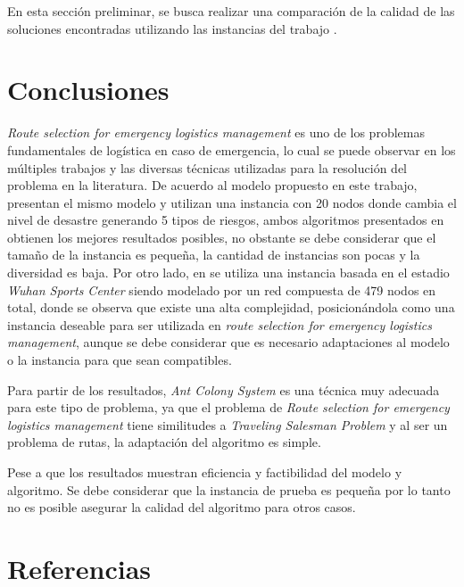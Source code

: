 \documentclass{llncs}
\begin{document}
En esta sección preliminar, se busca realizar una comparación de la calidad de las soluciones encontradas utilizando las instancias del trabajo  \cite{Yuan20091081}. 




\section{Conclusiones}

\textit{Route selection for emergency logistics management} es uno de los problemas fundamentales de logística en caso de emergencia, lo cual se puede observar en los múltiples trabajos y las diversas técnicas utilizadas para la resolución del problema en la literatura. De acuerdo al modelo propuesto en este trabajo, \cite{Yuan20091081,zhang2013route} presentan el mismo modelo y utilizan una instancia con 20 nodos donde cambia el nivel de desastre generando 5 tipos de riesgos, ambos algoritmos presentados en \cite{Yuan20091081,zhang2013route} obtienen los mejores resultados posibles, no obstante se debe considerar que el tamaño de la instancia es pequeña, la cantidad de instancias son pocas y la diversidad es baja. Por otro lado, en  \cite{zong2010multi,zong2010multiflow,zong2014conflict} se utiliza una instancia basada en el estadio \textit{Wuhan Sports Center} siendo modelado por un red compuesta de  479 nodos en total, donde se observa que existe una alta complejidad, posicionándola como una instancia deseable para ser utilizada en \textit{route selection for emergency logistics management}, aunque se debe considerar que es necesario adaptaciones al modelo o la instancia para que sean compatibles.

Para partir de los resultados,  \textit{Ant Colony System} es una técnica muy adecuada para este tipo de problema, ya que el problema de \textit{Route selection for emergency logistics management} tiene similitudes a  \textit{Traveling Salesman Problem} y al ser un problema de rutas, la adaptación del algoritmo es simple. 

Pese a que los resultados muestran eficiencia y factibilidad del modelo y algoritmo. Se debe considerar que la instancia de prueba es pequeña por lo tanto no es posible asegurar la calidad del algoritmo para otros casos.


\section{Referencias}
\begingroup
\renewcommand{\section}[2]{}%

\endgroup
\end{document}
